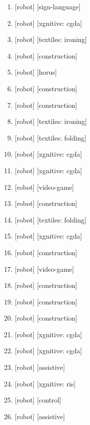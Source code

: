 \documentclass{article}
\begin{document}
\begin{enumerate}
  \item {} [robot] [sign-language]
  \item {} [robot] [xgnitive: cgda]
  \item {} [robot] [textiles: ironing]
  \item {} [robot] [construction]
  \item {} [robot] [horus]
  \item {} [robot] [construction]
  \item {} [robot] [construction]
  \item {} [robot] [textiles: ironing]
  \item {} [robot] [textiles: folding]
  \item {} [robot] [xgnitive: cgda]
  \item {} [robot] [xgnitive: cgda]
  \item {} [robot] [video-game]
  \item {} [robot] [construction]
  \item {} [robot] [textiles: folding]
  \item {} [robot] [xgnitive: cgda]
  \item {} [robot] [construction]
  \item {} [robot] [video-game]
  \item {} [robot] [construction]
  \item {} [robot] [construction]
  \item {} [robot] [construction]
  \item {} [robot] [xgnitive: cgda]
  \item {} [robot] [xgnitive: cgda]
  \item {} [robot] [assistive]
  \item {} [robot] [xgnitive: ris]
  \item {} [robot] [control]
  \item {} [robot] [assistive]

\end{enumerate}
\end{document}
